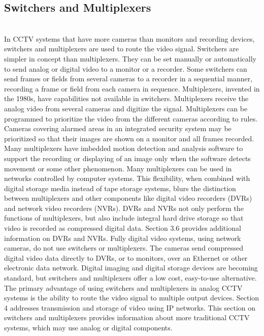 \documentclass[12pt,fleqn]{book} %
\begin{document}
\subsection{Switchers and Multiplexers}
\\In CCTV systems that have more cameras than monitors and recording devices, switchers and multiplexers are used to route the video signal. Switchers are simpler in concept than multiplexers. They can be set manually or automatically to send analog or digital video to a monitor or a recorder. Some switchers can send frames or fields from several cameras to a recorder in a sequential manner, recording a frame or field from each camera in sequence. Multiplexers, invented in the 1980s, have capabilities not available in switchers. Multiplexers receive the analog video from several cameras and digitize the signal. Multiplexers can be programmed to prioritize the video from the different cameras according to rules. Cameras covering alarmed areas in an integrated security system may be prioritized so that their images are shown on a monitor and all frames recorded. Many multiplexers have imbedded motion detection and analysis software to support the recording or displaying of an image only when the software detects movement or some other phenomenon. Many multiplexers can be used in networks controlled by computer systems. This flexibility, when combined with digital storage media instead of tape storage systems, blurs the distinction between multiplexers and other components like digital video recorders (DVRs) and network video recorders (NVRs). DVRs and NVRs not only perform the functions of multiplexers, but also include integral hard drive storage so that video is recorded as compressed digital data. Section 3.6 provides additional information on DVRs and NVRs. Fully digital video systems, using network cameras, do not use switchers or multiplexers. The cameras send compressed digital video data directly to DVRs, or to monitors, over an Ethernet or other electronic data network. Digital imaging and digital storage devices are becoming standard, but switchers and multiplexers offer a low cost, easy-to-use alternative. The primary advantage of using switchers and multiplexers in analog CCTV systems is the ability to route the video signal to multiple output devices. Section 4 addresses transmission and storage of video using IP networks. This section on switchers and multiplexers provides information about more traditional CCTV systems, which may use analog or digital components.
\end{document}
